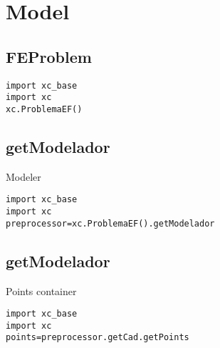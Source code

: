 \chapter{Model}


\section{FEProblem}
\begin{verbatim}
import xc_base
import xc
xc.ProblemaEF()
\end{verbatim}

\section{getModelador}\label{getModelador}
Modeler
\begin{verbatim}
import xc_base
import xc
preprocessor=xc.ProblemaEF().getModelador
\end{verbatim}

\section{getModelador}\label{getModelador}
Points container
\begin{verbatim}
import xc_base
import xc
points=preprocessor.getCad.getPoints
\end{verbatim}

